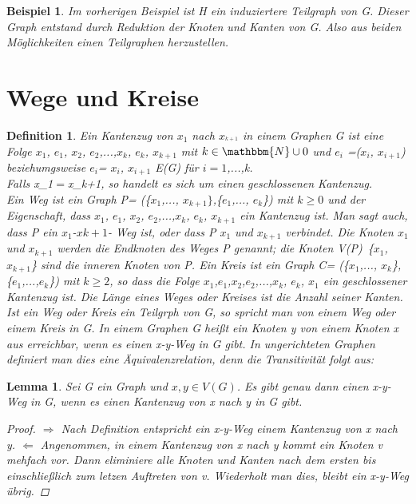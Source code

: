 \documentclass{article}
\newtheorem{definition}[satz]{Definition}
\newtheorem{lemma}[satz]{Lemma}
\newtheorem{beispiel}[satz]{Beispiel}
\begin{document}
  \begin {beispiel}
    Im vorherigen Beispiel ist H ein induziertere Teilgraph von G.
    Dieser Graph entstand durch Reduktion der Knoten und Kanten von G.
    Also aus beiden Möglichkeiten einen Teilgraphen herzustellen.
    \end {beispiel}
  \vspace{\baselineskip}  
\newpage

\section{Wege und Kreise}

  \begin {definition} 
  Ein Kantenzug von $x_1$ nach $x_^{k+1}$ in einem Graphen G ist eine Folge $x_1$, $e_1$, $x_2$, $e_2$,...,$x_k$, $e_k$, $x_{k+1}$ mit $k\in {\mathbbm{N}} \cup {0}$ und  $e_i$ =($x_i$, $x_{i+1}$) beziehumgsweise $e_i$= {$x_i$, $x_{i+1}$} \in E(G) für $i=1$,...,k$ $.\\
  Falls  $ $x_1$= $x_{k+1}$ $, so handelt es sich um einen geschlossenen Kantenzug.\\
  Ein Weg ist ein Graph P= (\{$x_1$,..., $x_{k+1}\}$,\{$e_1$,..., $e_k$\}) mit $k\geq 0$ und der Eigenschaft, dass $x_1$, $e_1$, $x_2$, $e_2$,...,$x_k$, $e_k$, $x_{k+1}$ ein Kantenzug ist.
  Man sagt auch, dass P ein $x_1$-$x{k+1}$- Weg ist, oder dass P $x_1$ und $x_{k+1}$ verbindet.
  Die Knoten $x_1$ und $x_{k+1}$ werden die Endknoten des Weges P genannt; die Knoten V(P)\ \{$x_1$, $x_{k+1}$\} sind die inneren Knoten von P.
  Ein Kreis ist ein Graph C= (\{$x_1$,..., $x_k$\}, \{$e_1$,...,$e_k$\}) mit $k\geq 2$, so dass die Folge $x_1$,$e_1$,$x_2$,$e_2$,...,$x_k$, $e_k$, $x_1$ ein geschlossener Kantenzug ist.
  Die Länge eines Weges oder Kreises ist die Anzahl seiner Kanten. 
  Ist ein Weg oder Kreis ein Teilgrph von G, so spricht man von einem Weg oder einem Kreis in G.
  In einem Graphen G heißt ein Knoten y von einem Knoten x aus erreichbar, wenn es einen x-y-Weg in G gibt.
  In ungerichteten Graphen definiert man dies eine Äquivalenzrelation, denn die Transitivität folgt aus:
  \end{definition}
  \vspace{\baselineskip}

  \begin{lemma} 
    Sei G ein Graph und $x, y\in V(G)$. Es gibt genau dann einen x-y-Weg in G, wenn es einen Kantenzug von x nach y in G gibt.
    \begin{proof}
     $ \Rightarrow$ Nach Definition entspricht ein x-y-Weg einem Kantenzug von x nach y.
     $\Leftarrow$ Angenommen, in einem Kantenzug von x nach y kommt ein Knoten v mehfach vor.
     Dann eliminiere alle Knoten und Kanten nach dem ersten bis einschließlich zum letzen Auftreten von v.
     Wiederholt man dies, bleibt ein x-y-Weg übrig.
    \end{proof}
  \end{lemma}
  \vspace{\baselineskip}
\end{document}
